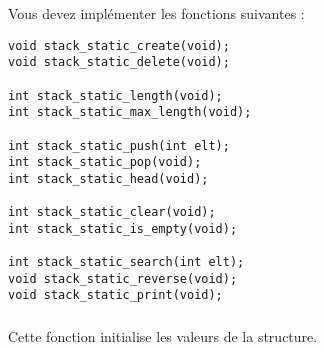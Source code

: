 
\noindent Vous devez implémenter les fonctions suivantes :

\bigskip

\lstset{language=C}
\begin{lstlisting}[frame=single,title={Liste des fonctions pour une pile avec liste chaînée}]
void stack_static_create(void);
void stack_static_delete(void);

int stack_static_length(void);
int stack_static_max_length(void);

int stack_static_push(int elt);
int stack_static_pop(void);
int stack_static_head(void);

int stack_static_clear(void);
int stack_static_is_empty(void);

int stack_static_search(int elt);
void stack_static_reverse(void);
void stack_static_print(void);
\end{lstlisting}


\subsubsection*{}

\noindent Cette fonction initialise les valeurs de la structure.


\subsubsection*{}

